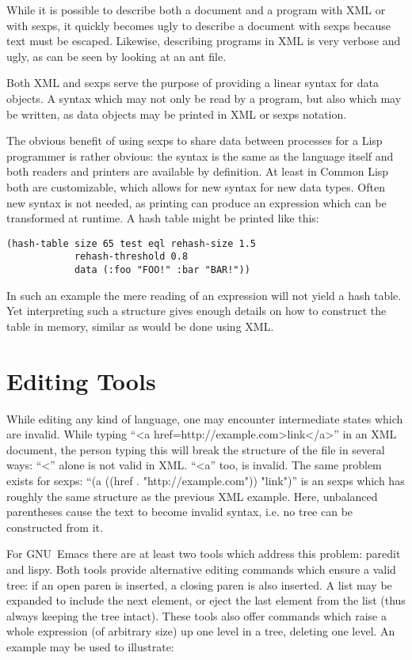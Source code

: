 \documentclass[a4paper,10pt,twoside]{report}
\newcommand{\cl}{Common Lisp}
\newcommand{\emacs}{GNU~Emacs}
\begin{document}
While it is possible to describe both a document and a program with XML or with
sexps, it quickly becomes ugly to describe a document with sexps because text
must be escaped.  Likewise, describing programs in XML is very verbose and ugly,
as can be seen by looking at an ant file.

Both XML and sexps serve the purpose of providing a linear syntax for data
objects.  A syntax which may not only be read by a program, but also which may
be written, as data objects may be printed in XML or sexps notation.

The obvious benefit of using sexps to share data between processes for a Lisp
programmer is rather obvious: the syntax is the same as the language itself and
both readers and printers are available by definition.  At least in \cl{} both
are customizable, which allows for new syntax for new data types.  Often new
syntax is not needed, as printing can produce an expression which can be
transformed at runtime.  A hash table might be printed like this:
\begin{lstlisting}[style=lispinline]
(hash-table size 65 test eql rehash-size 1.5
            rehash-threshold 0.8
            data (:foo "FOO!" :bar "BAR!"))
\end{lstlisting}

In such an example the mere reading of an expression will not yield a hash
table.  Yet interpreting such a structure gives enough details on how to
construct the table in memory, similar as would be done using XML.

\section{Editing Tools}
\label{subsec:edit-tools}

While editing any kind of language, one may encounter intermediate states which
are invalid.  While typing ``<a href=http://example.com>link</a>'' in an XML
document, the person typing this will break the structure of the file in several
ways:  ``<'' alone is not valid in XML.  ``<a'' too, is invalid.  The same
problem exists for sexps: ``(a ((href . "http://example.com")) "link")'' is an
sexps which has roughly the same structure as the previous XML example.  Here,
unbalanced parentheses cause the text to become invalid syntax, i.e. no tree can
be constructed from it.

For \emacs{} there are at least two tools which address this problem:
paredit\cite{paredit} and lispy\cite{lispy}.  Both tools provide alternative
editing commands which ensure a valid tree:  if an open paren is inserted, a
closing paren is also inserted.  A list may be expanded to include the next
element, or eject the last element from the list (thus always keeping the tree
intact).  These tools also offer commands which raise a whole expression (of
arbitrary size) up one level in a tree, deleting one level.  An example may be
used to illustrate:
\end{document}
